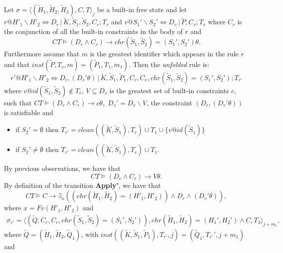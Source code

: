 \documentclass[final]{acmtrans2e}
\newcommand{\la}{\langle}
\newcommand{\ra}{\rangle}
\begin{document}
Let  $\sigma=\la (\tilde H_1,\tilde H_2,\tilde H_3) , C, T\ra_j$ be a built-in free state
and let
$r@H'_1\backslash H'_2 \Leftrightarrow  D_r\,|\,\tilde K, \tilde S_1, \tilde S_2, C_r; T_r $ and
$v@S_1'\backslash S_2' \Leftrightarrow  D_v\,|\, \tilde P, C_v;T_v$
where $C_r$ is the conjunction of all the built-in constraints in the body
of $r$ and
\begin{equation}\label{13marzo1}
    CT \models (D_r \wedge C_r) \rightarrow chr(\tilde S_1, \tilde S_2)=(S_1',
S_2')\theta.
\end{equation}
Furthermore assume that $m$ is the greatest identifier which appears in the
rule $r$ and that $inst(\tilde P, T_v,m)=(\tilde P_1, T_1, m_1)$.
Then the \emph{unfolded} rule is:
\[
    r'@ H'_1\backslash H'_2
\Leftrightarrow D_r, (D_v'\theta)\, |\, \tilde K,\tilde S_1,\tilde
P_1, C_r, C_v, chr(\tilde S_1, \tilde S_2)= (S_1', S_2'); T_{r'}
\]
where $v @id (\tilde S_1, \tilde S_2) \not \in T_r$,
$V\subseteq D_v$ is the greatest set of built-in constraints $c$,
such that
$CT \models (D_r\wedge C_r)\rightarrow c\theta,$
$D_v'= D_v\backslash V$, the
constraint $(D_r, (D_v'\theta))$ is satisfiable and
\begin{itemize}
    \item if $S_2'=\emptyset$ then $T_{r'}=clean((\tilde K,\tilde S_1) ,  T_r) \cup T_1 \cup
              \{v @id (\tilde S_1)\}$
    \item if $S_2'\not =\emptyset$ then $T_{r'}=clean((\tilde K,\tilde S_1) ,  T_r) \cup T_1$.
    \end{itemize}
    By previous observations, we have that
    \begin{equation}\label{10dic2}
    CT \models (D_r\wedge C_r)\rightarrow V\theta.
\end{equation}
 By definition of the transition \textbf{Apply'}, we have that
\begin{equation}\label{10dic1}
    CT\models C\rightarrow \exists_x((chr(\tilde H_1,
\tilde H_2)=(H'_1, H'_2))\wedge D_r\wedge (D_v'\theta)),
\end{equation}
where $ x=Fv(H'_1,H'_2)$ and
$$\begin{array}{l}
    \sigma_{r'}=\la (\tilde Q, C_r, C_v,chr(\tilde S_1, \tilde S_2)= (S_1', S_2')),
chr(\tilde H_1, \tilde H_2)= (H_1', H_2')\wedge C, T_3\ra_{j+m_1},
  \end{array}
  $$
     where
     $\tilde Q=(\tilde H_1,\tilde H_3,\tilde Q_1)$, with
     $inst ((\tilde K,\tilde S_1,\tilde P_1), T_{r'}, j)=(\tilde Q_1, T_{r'}', j+m_1)$ and
\end{document}
